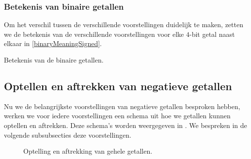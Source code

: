 \subsubsection{Betekenis van binaire getallen}
Om het verschil tussen de verschillende voorstellingen duidelijk te maken, zetten we de betekenis van de verschillende voorstellingen voor elke $4$-bit getal naast elkaar in \ref{binaryMeaningSigned}.

\begin{table}[hbt]
\centering
{}
\caption{Betekenis van de binaire getallen.}
\end{table}

\subsection{Optellen en aftrekken van negatieve getallen}
Nu we de belangrijkste voorstellingen van negatieve getallen besproken hebben, werken we voor iedere voorstellingen een schema uit hoe we getallen kunnen optellen en aftrekken. Deze schema's worden weergegeven in . We bespreken in de volgende subsubsecties deze voorstellingen.

\begin{figure}[hbt]
\centering
{}
\caption{Optelling en aftrekking van gehele getallen.}
\end{figure}

